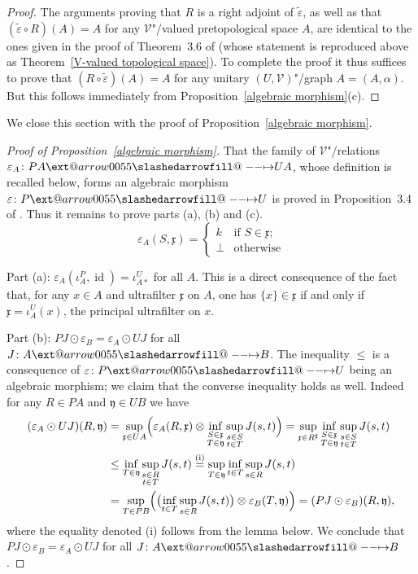\documentclass[preprint, a4paper]{elsarticle}
\makeatletter
\def\slashedarrowfill@#1#2#3#4#5{%
  $\m@th\thickmuskip0mu\medmuskip\thickmuskip\thinmuskip\thickmuskip
   \relax#5#1\mkern-7mu%
   \cleaders\hbox{$#5\mkern-2mu#2\mkern-2mu$}\hfill
   \mathclap{#3}\mathclap{#2}%
   \cleaders\hbox{$#5\mkern-2mu#2\mkern-2mu$}\hfill
   \mkern-7mu#4$%
}
\def\rightslashedarrowfill@{%
  \slashedarrowfill@\relbar\relbar\mapstochar\rightarrow}
\newcommand\xslashedrightarrow[2][]{%
  \ext@arrow 0055{\rightslashedarrowfill@}{#1}{#2}}
\def\slashedrightarrow{\xslashedrightarrow{}}
\theoremstyle{definition}
\theoremstyle{remark}
\providecommand{\propref}[1]{Proposition~\ref{#1}}
\providecommand{\thmref}[1]{Theorem~\ref{#1}}
\providecommand{\of}{\circ}
\providecommand{\eps}{\varepsilon}
\providecommand{\tens}{\otimes}
\providecommand{\mf}[1]{\mathfrak{#1}}
\providecommand{\brcs}[1]{\lbrace #1 \rbrace}
\providecommand{\bigpars}[1]{\bigl(#1\bigr)}
\providecommand{\Bigpars}[1]{\Bigl(#1\Bigr)}
\providecommand{\set}[1]{\brcs{#1}}
\providecommand{\hmap}[3]{#1\colon#2\slashedrightarrow#3}
\DeclareMathOperator{\id}{id}
\providecommand{\catvar}[1]{\mathcal{#1}}
\providecommand{\2}{\mathsf 2}
\providecommand{\V}{\catvar V}
\providecommand{\hc}{\odot}
\makeatother
\begin{document}
\begin{proof}
		The arguments proving that $R$ is a right adjoint of $\tilde \eps$, as well as that $(\tilde \eps \of R)(A) = A$ for any $\V$"/valued pretopological space $A$, are identical to the ones given in the proof of Theorem~3.6 of \cite{Lai-Tholen17a} (whose statement is reproduced above as \thmref{V-valued topological space}). To complete the proof it thus suffices to prove that $(R \of \tilde \eps)(A) = A$ for any unitary $(U, \V)$"/graph $A = (A, \alpha)$. But this follows immediately from \propref{algebraic morphism}(c).
	\end{proof}

	We close this section with the proof of \propref{algebraic morphism}.
	\begin{proof}[Proof of \propref{algebraic morphism}]
		That the family of $\V$"/relations $\hmap{\eps_A}{PA}{UA}$, whose definition is recalled below, forms an algebraic morphism $\hmap\eps PU$ is proved in Proposition~3.4 of \cite{Lai-Tholen17a}. Thus it remains to prove parts (a), (b) and (c).
		\begin{displaymath}
  		\eps_A(S, \mf x) = \begin{cases}
  			k & \text{if $S \in \mf x$;} \\
  			\bot & \text{otherwise}
  		\end{cases}
  	\end{displaymath}
		
		Part (a): $\eps_A(\iota^P_A, \id) = \iota^U_{A*}$ for all $A$. This is a direct consequence of the fact that, for any $x \in A$ and ultrafilter $\mf x$ on $A$, one has $\set x \in \mf x$ if and only if $\mf x = \iota^U_A(x)$, the principal ultrafilter on $x$.
		
		Part (b): $PJ \hc \eps_B = \eps_A \hc UJ$ for all $\hmap JAB$. The inequality $\leq$ is a consequence of $\hmap\eps PU$ being an algebraic morphism; we claim that the converse inequality holds as well. Indeed for any $R \in PA$ and $\mf y \in UB$ we have
		\begin{align*}
			(\eps_A \hc UJ)(R, \mf y) &= \sup_{\mf x \in UA} \Bigpars{\eps_A(R, \mf x) \tens \inf_{\substack{S \in \mf x \\ T \in \mf y}} \sup_{\substack{s \in S \\ t \in T}} J(s, t)} = \sup_{\mf x \in R^\sharp} \inf_{\substack{S \in \mf x \\ T \in \mf y}} \sup_{\substack{s \in S \\ t \in T}} J(s, t) \\
			&\leq \inf_{T \in \mf y} \sup_{\substack{s \in R \\ t \in T}} J(s, t) \overset{\text{(i)}}= \sup_{T \in \mf y} \inf_{t \in T} \sup_{s \in R} J(s, t) \\
			&= \sup_{T \in PB} \Bigpars{\bigpars{\inf_{t \in T} \sup_{s \in R} J(s, t)} \tens \eps_B(T, \mf y)} = (PJ \hc \eps_B)(R, \mf y),
		\end{align*}
		where the equality denoted (i) follows from the lemma below. We conclude that $PJ \hc \eps_B = \eps_A \hc UJ$ for all $\hmap JAB$.
		

\end{proof}
\end{document}
